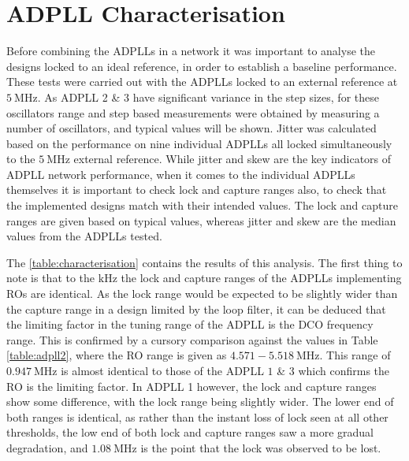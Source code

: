 \section{\acs{ADPLL} Characterisation}
Before combining the \acp{ADPLL} in a network it was important to analyse the designs locked to an ideal reference, in order to establish a baseline performance. These tests were carried out with the \acp{ADPLL} locked to an external reference at $5~\si{\mega\hertz}$. As \ac{ADPLL} 2 \& 3 have significant variance in the step sizes, for these oscillators range and step based measurements were obtained by measuring a number of oscillators, and typical values will be shown. Jitter was calculated based on the performance on nine individual \acp{ADPLL} all locked simultaneously to the $5~\si{\mega\hertz}$ external reference. While jitter and skew are the key indicators of \ac{ADPLL} network performance, when it comes to the individual \acp{ADPLL} themselves it is important to check lock and capture ranges also, to check that the implemented designs match with their intended values. The lock and capture ranges are given based on typical values, whereas jitter and skew are the median values from the \acp{ADPLL} tested.

The \ref{table:characterisation} contains the results of this analysis. The first thing to note is that to the $\si{\kilo\hertz}$ the lock and capture ranges of the \acp{ADPLL} implementing \acp{RO} are identical. As the lock range would be expected to be slightly wider than the capture range in a design limited by the loop filter, it can be deduced that the limiting factor in the tuning range of the \ac{ADPLL} is the \ac{DCO} frequency range. This is confirmed by a cursory comparison against the values in Table \ref{table:adpll2}, where the \ac{RO} range is given as $4.571-5.518~\si{\mega\hertz}$. This range of $0.947~\si{\mega\hertz}$ is almost identical to those of the \ac{ADPLL} $1$ \& $3$ which confirms the \ac{RO} is the limiting factor. In \ac{ADPLL} 1 however, the lock and capture ranges show some difference, with the lock range being slightly wider. The lower end of both ranges is identical, as rather than the instant loss of lock seen at all other thresholds, the low end of both lock and capture ranges saw a more gradual degradation, and $1.08~\si{\mega\hertz}$ is the point that the lock was observed to be lost.

